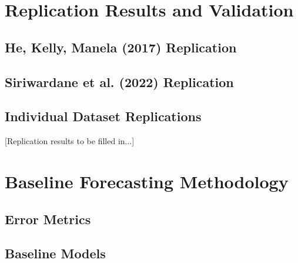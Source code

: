 \documentclass{article}
\begin{document}
\section{Replication Results and Validation}
\label{sec:replication}


\subsection{He, Kelly, Manela (2017) Replication}

\subsection{Siriwardane et al. (2022) Replication}

\subsection{Individual Dataset Replications}

[Replication results to be filled in...]

\section{Baseline Forecasting Methodology}
\label{sec:methodology}


\subsection{Error Metrics}

\subsection{Baseline Models}
\end{document}
